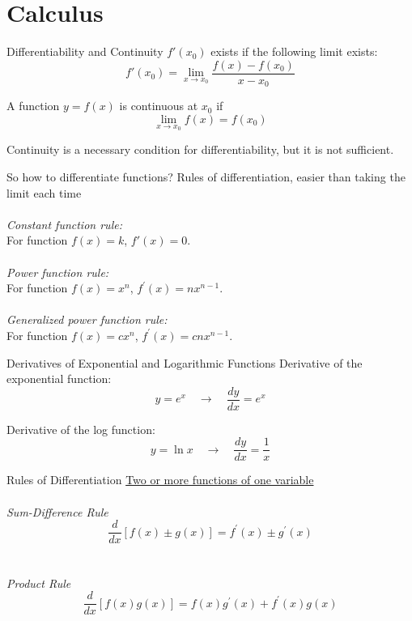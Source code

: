 \documentclass{./../../Latex/teaching_slides}
\begin{document}
\section{Calculus}

\begin{frame}{Differentiability and Continuity}
$f'(x_0)$ exists if the following limit exists: 
$$  f'(x_0)= \lim_{ x \rightarrow x_0} \frac{f(x)-f(x_{0})}{x-x_0}  $$


\vspace{1em}
A function $y=f(x)$ is continuous at $x_0$ if $$\lim _{x \rightarrow x_0} f(x) = f(x_0)$$

Continuity is a necessary condition for differentiability, but it is not sufficient.
\end{frame}

\begin{frame}{So how to differentiate functions?}
Rules of differentiation, easier than taking the limit each time \\~\\
\textit{Constant function rule:}\\
For function \(f(x)=k \), $ f'(x)=0 $.\\~\\
\textit{Power function rule:}\\
For function \( f(x)=x^{n} \), \( f^{\prime}(x)=n x^{n-1} \).\\~\\
\textit{Generalized power function rule:}\\
For function \( f(x)=c x^{n} \), \( f^{\prime}(x)=c n x^{n-1} \).
\end{frame}

\begin{frame}{Derivatives of Exponential and Logarithmic Functions}
Derivative of the exponential function:
 $$y=e^x \quad \rightarrow \quad \frac{dy}{dx} = e^x$$
 
Derivative of the log function:
 $$y=\ln x \quad \rightarrow \quad \frac{dy}{dx} = \frac{1}{x}$$
\end{frame}

\begin{frame}{Rules of Differentiation}
\underline{Two or more functions of one variable} \\~\\ 
\textit{Sum-Difference Rule}
$$ \frac{d}{d x}[f(x) \pm g(x)]=f^{\prime}(x) \pm g^{\prime}(x) $$\\~\\

\textit{Product Rule} \\
$$
\frac{d}{d x}[f(x) g(x)]=f(x) g^{\prime}(x)+f^{\prime}(x) g(x)
$$
\end{frame}
\end{document}
